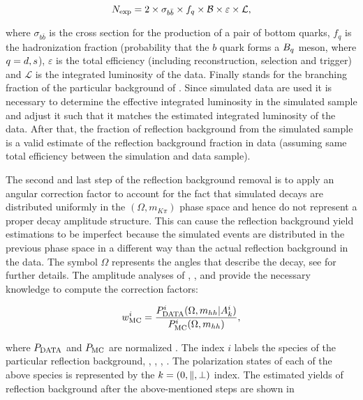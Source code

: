 \begin{equation}
N_{\rm exp} = 2 \times \sigma_{b\bar{b}}\times f_q \times {\ensuremath{\cal B}} \times \varepsilon \times {\mathcal{L}},
\end{equation}

\noindent where $\sigma_{b\bar{b}}$ is the cross section for the production of a pair of bottom quarks, $f_q$ is the hadronization fraction
(probability that the $b$ quark forms a $B_q$ meson, where $q=d,s$), $\varepsilon$ is the total efficiency (including reconstruction,
selection and trigger) and ${\mathcal{L}}$ is the integrated luminosity of the data. Finally \BF stands for the branching fraction
of the particular background of . Since simulated data are used it is necessary to determine
the effective integrated luminosity in the simulated sample and adjust it such that it matches the estimated integrated
luminosity of the data. After that, the fraction of reflection background from the simulated sample is a valid estimate
of the reflection background fraction in data (assuming same total efficiency between the simulation and data sample).

The second and last step of the reflection background removal is to apply an angular correction factor to account for
the fact that simulated decays are distributed uniformly in the $(\Omega, m_{K\pi})$ phase space and hence do not
represent a proper decay amplitude structure. This can cause the reflection background yield estimations to be
imperfect because the simulated events are distributed in the previous phase space in a different way than the
actual reflection background in the data. The symbol $\Omega$ represents the angles that describe the \BsJpsiKst
decay, see  for further details. The amplitude analyses of \BdJpsipipi \cite{SheldonBdpipi},
\BsJpsipipi \cite{SheldonBspipi}, \BsJpsiKK \cite{SheldonKK} and \LbJpsipK \cite{Gao:1701984} provide the necessary
knowledge to compute the correction factors:

\begin{equation}
\centering
w_{\rm MC}^i = \frac{P_{\rm DATA}^i (\Omega, m_{hh}  | A_k^i)} {P_{\rm MC}^i(\Omega, m_{hh})},
\end{equation}

\noindent where $P_{\rm DATA}$ and $P_{\rm MC}$ are normalized \pdfs.
The index $i$ labels the species of the particular reflection background, \ie \BdJpsipipi, \BsJpsipipi, \BsJpsiKK, \LbJpsipK.
The polarization states of each of the above species is represented by the $k=\left( 0, \parallel, \perp \right)$ index.
The estimated yields of reflection background after the above-mentioned steps are shown in 

